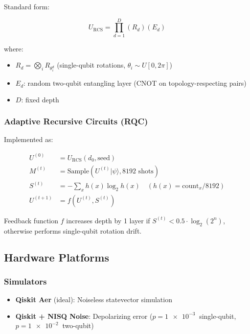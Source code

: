 \documentclass[twocolumn]{article}
\begin{document}
Standard form:

\begin{equation}
U_{\text{RCS}} = \prod_{d=1}^{D} (R_d)(E_d)
\end{equation}

where:
\begin{itemize}
\item $R_d = \bigotimes_i R_{\theta_i^d}$ (single-qubit rotations, $\theta_i \sim U[0, 2\pi]$)
\item $E_d$: random two-qubit entangling layer (CNOT on topology-respecting pairs)
\item $D$: fixed depth
\end{itemize}

\subsubsection{Adaptive Recursive Circuits (RQC)}

Implemented as:

\begin{equation}
\begin{aligned}
U^{(0)} &= U_{\text{RCS}}(d_0, \text{seed}) \\
M^{(t)} &= \text{Sample}(U^{(t)} |\psi\rangle, 8192 \text{ shots}) \\
S^{(t)} &= -\sum_x h(x) \log_2 h(x) \quad (h(x) = \text{count}_x / 8192) \\
U^{(t+1)} &= f(U^{(t)}, S^{(t)})
\end{aligned}
\end{equation}

Feedback function $f$ increases depth by 1 layer if $S^{(t)} < 0.5 \cdot \log_2(2^n)$, otherwise performs single-qubit rotation drift.

\subsection{Hardware Platforms}

\subsubsection{Simulators}

\begin{itemize}
\item \textbf{Qiskit Aer} (ideal): Noiseless statevector simulation
\item \textbf{Qiskit + NISQ Noise}: Depolarizing error ($p=\SI{1e-3}{}$ single-qubit, $p=\SI{1e-2}{}$ two-qubit)
\end{itemize}
\end{document}
